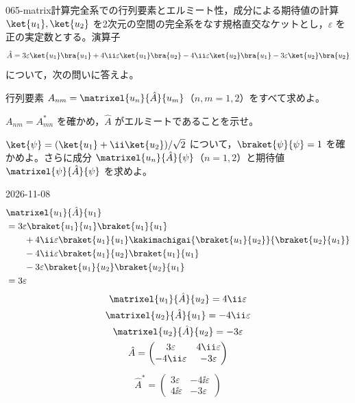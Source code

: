\documentclass[uplatex,dvipdfmx,a4paper,11pt]{jsarticle}
\begin{document}
\mondaihen
{}
\begin{mondai}{065-matrix}{計算}{完全系での行列要素とエルミート性，成分による期待値の計算}
$\ket{u_{1}},\ket{u_{2}}$ を2次元の空間の完全系をなす規格直交なケットとし，$\varepsilon$ を正の実定数とする。演算子
  \[ \hat{A}=3\varepsilon\ket{u_{1}}\bra{u_{1}}+4\ii\varepsilon\ket{u_{1}}\bra{u_{2}}-4\ii\varepsilon\ket{u_{2}}\bra{u_{1}}-3\varepsilon\ket{u_{2}}\bra{u_{2}} \]
  について，次の問いに答えよ。
  \begin{shoumon}
    \item 行列要素 $A_{nm}=\matrixel{u_{n}}{\hat{A}}{u_{m}}$（$n,m=1,2$）をすべて求めよ。
    \item $A_{nm}=A_{mn}^{*}$ を確かめ，$\hat{A}$ がエルミートであることを示せ。
    \item $\ket{\psi}=(\ket{u_{1}}+\ii\ket{u_{2}})/\sqrt{2}$ について，$\braket{\psi}{\psi}=1$ を確かめよ。さらに成分 $\matrixel{u_{n}}{\hat{A}}{\psi}$（$n=1,2$）と期待値 $\matrixel{\psi}{\hat{A}}{\psi}$ を求めよ。
  \end{shoumon}
\begin{kotaeutsushi}{2026-11-08}
\begin{align*}
&\matrixel{u_{1}}{\hat{A}}{u_{1}}\\
&=3\varepsilon\braket{u_{1}}{u_{1}}\braket{u_{1}}{u_{1}}\\
&\qquad+4\ii\varepsilon\braket{u_{1}}{u_{1}}\kakimachigai{\braket{u_{1}}{u_{2}}}{\braket{u_{2}}{u_{1}}}\\
&\qquad-4\ii\varepsilon\braket{u_{1}}{u_{2}}\braket{u_{1}}{u_{1}}\\
&\qquad-3\varepsilon\braket{u_{1}}{u_{2}}\braket{u_{2}}{u_{1}}\\
&=3\varepsilon
\end{align*}
\begin{gather*}
\matrixel{u_{1}}{\hat{A}}{u_{2}}=4\ii\varepsilon\\
\matrixel{u_{2}}{\hat{A}}{u_{1}}=-4\ii\varepsilon\\
\matrixel{u_{2}}{\hat{A}}{u_{2}}=-3\varepsilon\\
\hat{A}=\begin{pmatrix}3\varepsilon&4\ii\varepsilon\\-4\ii\varepsilon&-3\varepsilon\end{pmatrix}
\end{gather*}
\begin{gather*}
\hat{A}^{*}=\begin{pmatrix}3\varepsilon&-4\ii\varepsilon\\4\ii\varepsilon&-3\varepsilon\end{pmatrix}\\

\end{gather*}
\end{kotaeutsushi}
\end{mondai}
\end{document}
